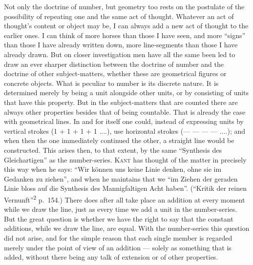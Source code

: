 \documentclass[12pt]{book}
\newcommand{\opage}[1]{\marginnote{\footnotesize\textit{[#1]}}}
\begin{document}
Not only the doctrine of number, but geometry too rests on the postulate of the
possibility of repeating one and the same act of thought. Whatever an act of
thought's content or object may be, I can always add a new act of thought to the
earlier ones. I can think of more horses than those I have seen, and more
``signs'' than those I have already written down, more line-segments than those I
have already drawn. But on closer investigation men have all the same been led to
draw an ever sharper distinction between the doctrine of number and the doctrine
\opage{86}of other subject-matters, whether these are geometrical figures or concrete
objects. What is peculiar to number is its discrete nature. It is determined
merely by being a unit alongside other units, or by consisting of units that have
this property. But in the subject-matters that are counted there are always other
properties besides that of being countable. That is already the case with
geometrical lines. In and for itself one could, instead of expressing units by
vertical strokes (1 + 1 + 1 + 1 ....), use horizontal strokes (--- --- --- ---
....); and when then the one immediately continued the other, a straight line
would be constructed. This arises then, to that extent, by the same ``Synthesis
des Gleichartigen'' as the number-series. \textsc{Kant} has thought of the matter
in precisely this way when he says: ``Wir können uns keine Linie denken, ohne sie
im Gedanken zu ziehen'', and when he maintains that we ``im Ziehen der geraden
Linie bloss auf die Synthesis des Mannigfaltigen Acht haben''. (``Kritik der
reinen Vernunft''\textsuperscript{2} p.\ 154.) There does after all take place an
addition at every moment while we draw the line, just as every time we add a unit
in the number-series. But the great question is whether we have the right to say
that the constant additions, while we draw the line, are equal. With the
number-series this question did not arise, and for the simple reason that each
single member is regarded merely under the point of view of an addition --- solely
as something that is added, without there being any talk of extension or of other
properties.
\end{document}
